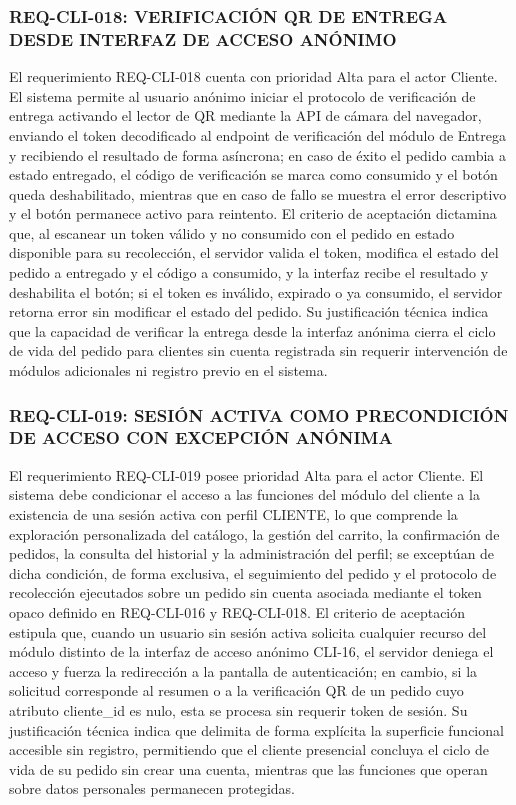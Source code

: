\subsubsection{REQ-CLI-018: VERIFICACIÓN QR DE ENTREGA DESDE INTERFAZ DE ACCESO ANÓNIMO}
El requerimiento REQ-CLI-018 cuenta con prioridad Alta para el actor Cliente. El sistema permite al usuario anónimo iniciar el protocolo de verificación de entrega activando el lector de QR mediante la API de cámara del navegador, enviando el token decodificado al endpoint de verificación del módulo de Entrega y recibiendo el resultado de forma asíncrona; en caso de éxito el pedido cambia a estado entregado, el código de verificación se marca como consumido y el botón queda deshabilitado, mientras que en caso de fallo se muestra el error descriptivo y el botón permanece activo para reintento. El criterio de aceptación dictamina que, al escanear un token válido y no consumido con el pedido en estado disponible para su recolección, el servidor valida el token, modifica el estado del pedido a entregado y el código a consumido, y la interfaz recibe el resultado y deshabilita el botón; si el token es inválido, expirado o ya consumido, el servidor retorna error sin modificar el estado del pedido. Su justificación técnica indica que la capacidad de verificar la entrega desde la interfaz anónima cierra el ciclo de vida del pedido para clientes sin cuenta registrada sin requerir intervención de módulos adicionales ni registro previo en el sistema.

\subsubsection{REQ-CLI-019: SESIÓN ACTIVA COMO PRECONDICIÓN DE ACCESO CON EXCEPCIÓN ANÓNIMA}
El requerimiento REQ-CLI-019 posee prioridad Alta para el actor Cliente. El sistema debe condicionar el acceso a las funciones del módulo del cliente a la existencia de una sesión activa con perfil CLIENTE, lo que comprende la exploración personalizada del catálogo, la gestión del carrito, la confirmación de pedidos, la consulta del historial y la administración del perfil; se exceptúan de dicha condición, de forma exclusiva, el seguimiento del pedido y el protocolo de recolección ejecutados sobre un pedido sin cuenta asociada mediante el token opaco definido en REQ-CLI-016 y REQ-CLI-018. El criterio de aceptación estipula que, cuando un usuario sin sesión activa solicita cualquier recurso del módulo distinto de la interfaz de acceso anónimo CLI-16, el servidor deniega el acceso y fuerza la redirección a la pantalla de autenticación; en cambio, si la solicitud corresponde al resumen o a la verificación QR de un pedido cuyo atributo cliente\_id es nulo, esta se procesa sin requerir token de sesión. Su justificación técnica indica que delimita de forma explícita la superficie funcional accesible sin registro, permitiendo que el cliente presencial concluya el ciclo de vida de su pedido sin crear una cuenta, mientras que las funciones que operan sobre datos personales permanecen protegidas.

